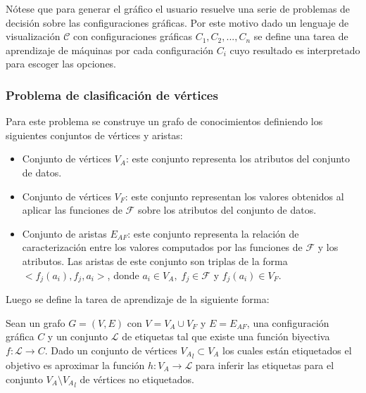 N\'otese que para generar el gr\'afico el usuario resuelve una serie de problemas de decisi\'on sobre las configuraciones gr\'aficas.
Por este motivo dado un lenguaje de visualizaci\'on $\mathcal{C}$ con configuraciones gr\'aficas $C_1, C_2, ..., C_n$
se define una tarea de aprendizaje de m\'aquinas por cada configuraci\'on $C_i$ cuyo resultado es interpretado para escoger las opciones.


\subsubsection{Problema de clasificaci\'on de v\'ertices}

Para este problema se construye un grafo de conocimientos definiendo
los siguientes conjuntos de v\'ertices y aristas:

\begin{itemize}
    \item Conjunto de v\'ertices $V_A$: este conjunto representa los atributos del conjunto de datos.
    \item Conjunto de v\'ertices $V_F$: este conjunto representan los valores obtenidos al aplicar las 
    funciones de $\mathcal{F}$ sobre los atributos del conjunto de datos. 
    \item Conjunto de aristas $E_{AF}$: este conjunto representa la relaci\'on de caracterizaci\'on entre los valores 
    computados por las funciones de $\mathcal{F}$ y los atributos. Las aristas de este conjunto son triplas de la forma $<f_j(a_i), f_j, a_i>$,
    donde $a_i \in V_A, \;f_j \in \mathcal{F}$ y $f_j(a_i) \in V_F$.
\end{itemize}


Luego se define la tarea de aprendizaje de la siguiente forma:

    Sean un grafo $G = (V,E)$ con $V = V_A \cup V_F$ y $E = E_{AF}$, una configuraci\'on
gr\'afica $C$ y un conjunto $\mathcal{L}$ de etiquetas tal que existe una funci\'on biyectiva $f : \mathcal{L} \to C$.
Dado un conjunto de v\'ertices ${V_A}_l \subset V_A $ los cuales est\'an etiquetados el objetivo es aproximar la funci\'on
$h : V_A \to \mathcal{L}$ para inferir las
etiquetas para el conjunto $V_A \setminus {V_A}_l$ de v\'ertices no etiquetados. 


